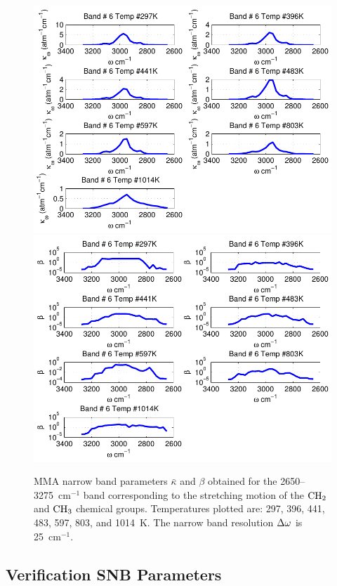 \begin{figure}[p]
\begin{center}
\includegraphics[width=5.0in]{Figures/MMA_Kappa_Band6_MALKMUS.pdf}
\includegraphics[width=5.0in]{Figures/MMA_Beta_Band6_MALKMUS.pdf}
\end{center}
\caption{MMA narrow band parameters $\bar{\kappa}$ and $\beta$ obtained for the 2650--3275~cm$^{-1}$ band corresponding to the stretching motion of the $\rm CH_2$ and $\rm CH_3$ chemical groups. Temperatures plotted are: 297, 396, 441, 483, 597, 803, and 1014~K. The narrow band resolution $\Delta \omega$ is 25~cm$^{-1}$.\label{fig:MMA_kappa_beta6}}
\end{figure}

\FloatBarrier

\subsection{Verification SNB Parameters}

